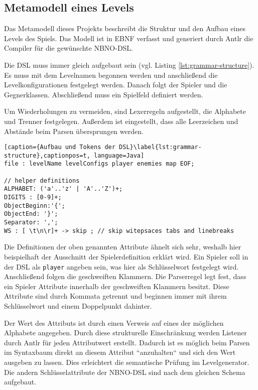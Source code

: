 \subsection{Metamodell eines Levels}
Das Metamodell dieses Projekts beschreibt die Struktur und den Aufbau eines Levels des Spiels. Das Modell ist in EBNF verfasst und generiert durch Antlr die Compiler für die gewünschte NBNO-DSL.

Die DSL muss immer gleich aufgebaut sein (vgl. Listing \ref{lst:grammar-structure}). Es muss mit dem Levelnamen begonnen werden und anschließend die Levelkonfigurationen festgelegt werden. Danach folgt der Spieler und die Gegnerklassen. Abschließend muss ein Spielfeld definiert werden.

Um Wiederholungen zu vermeiden, sind Lexerregeln aufgestellt, die Alphabete und Trenner festgelegen.
Außerdem ist eingestellt, dass alle Leerzeichen und Abstände beim Parsen übersprungen werden.

\begin{lstlisting}[caption={Aufbau und Tokens der DSL}\label{lst:grammar-structure},captionpos=t, language=Java] 
file : levelName levelConfigs player enemies map EOF;

// helper definitions
ALPHABET: ('a'..'z' | 'A'..'Z')+;
DIGITS : [0-9]+;
ObjectBeginn:'{';
ObjectEnd: '}';
Separator: ',';
WS : [ \t\n\r]+ -> skip ; // skip witepsaces tabs and linebreaks
\end{lstlisting}
 
Die Definitionen der oben genannten Attribute ähnelt sich sehr, weshalb hier beispielhaft der Ausschnitt der Spielerdefinition erklärt wird. Ein Spieler soll in der DSL als \texttt{player} angeben sein, was hier als Schlüsselwort festgelegt wird. Anschließend folgen die geschweiften Klammern. Die Parserregel legt fest, dass ein Spieler Attribute innerhalb der geschweiften Klammern besitzt. Diese Attribute sind durch Kommata getrennt und beginnen immer mit ihrem Schlüsselwort und einem Doppelpunkt dahinter. 

Der Wert des Attributs ist durch einen Verweis auf eines der möglichen Alphabete angegeben. Durch diese strukturelle Einschränkung werden Listener durch Antlr für jeden Attributwert erstellt. Dadurch ist es möglich beim Parsen im Syntaxbaum direkt an diesem Attribut ``anzuhalten`` und sich den Wert ausgeben zu lassen. Dies erleichtert die semantische Prüfung im Levelgenerator. Die andern Schlüsselattribute der NBNO-DSL sind nach dem gleichen Schema aufgebaut. 

